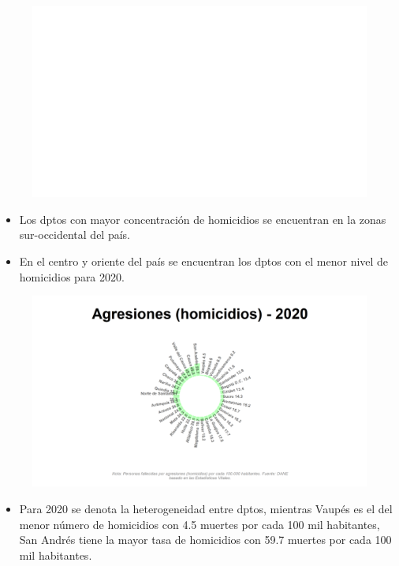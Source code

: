     \begin{figure}[H]
        \caption[Agresiones (homicidios) por departamentos (mapa) - 2010 VS 2020 ]{\label{homicid_dpto_map} }
        \begin{center}
        \includegraphics[width=\textwidth,keepaspectratio]{img/var_286_map.png}
        \end{center}
    \end{figure}
            \begin{itemize}
                \item Los dptos con mayor concentración de homicidios se encuentran en la zonas sur-occidental del país.
                \item En el centro y oriente del país se encuentran los dptos con el menor nivel de homicidios para 2020.
                \end{itemize}

    \begin{figure}[H]
        \caption[Agresiones (homicidios) por departamentos para 2020 ]{\label{homicid_dpto_static} }
        \begin{center}
        \includegraphics[width=\textwidth,keepaspectratio]{img/var_286_static.png}
        \end{center}
    \end{figure}
            \begin{itemize}
                \item Para 2020 se denota la heterogeneidad entre dptos, mientras Vaupés es el del menor número de homicidios con 4.5 muertes por cada 100 mil habitantes, San Andrés tiene la mayor tasa de homicidios con 59.7 muertes por cada 100 mil habitantes.
                \end{itemize}


